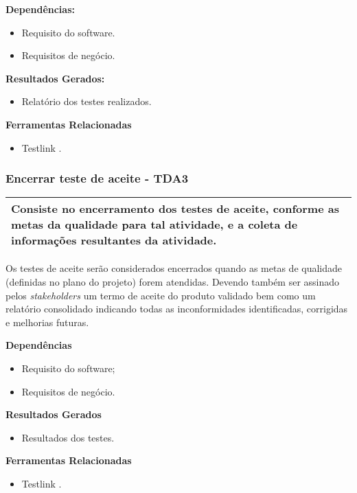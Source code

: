 \textbf{Dependências: }
\begin{itemize}
    \item Requisito do software.
    \item Requisitos de negócio.
\end{itemize}

\textbf{Resultados Gerados: }
\begin{itemize}
    \item Relatório dos testes realizados.  
\end{itemize}

\textbf{Ferramentas Relacionadas }
\begin{itemize}
    \item Testlink \cite{TestLink}. 
\end{itemize}

\subsubsection{Encerrar teste de aceite - TDA3}
\label{sec:tda3}

\begin{table}[!ht]
\centering
\begin{tabular}{|p{130mm}|}
\hline
Consiste no encerramento dos testes de aceite, conforme as metas da qualidade para tal atividade, e a coleta de informações resultantes da atividade. \\ 
\hline
\end{tabular}
\end{table}

Os testes de aceite serão considerados encerrados quando as metas de qualidade (definidas no plano do projeto) forem atendidas. Devendo também ser assinado pelos \textit{stakeholders} um termo de aceite do produto validado bem como um relatório consolidado indicando todas as inconformidades identificadas, corrigidas e melhorias futuras.

\textbf{Dependências}
\begin{itemize}
    \item Requisito do software;
    \item Requisitos de negócio.
\end{itemize}

\textbf{Resultados Gerados}
\begin{itemize}
    \item Resultados dos testes.
\end{itemize}

\textbf{Ferramentas Relacionadas}
\begin{itemize}
    \item Testlink \cite{TestLink}.
\end{itemize}

